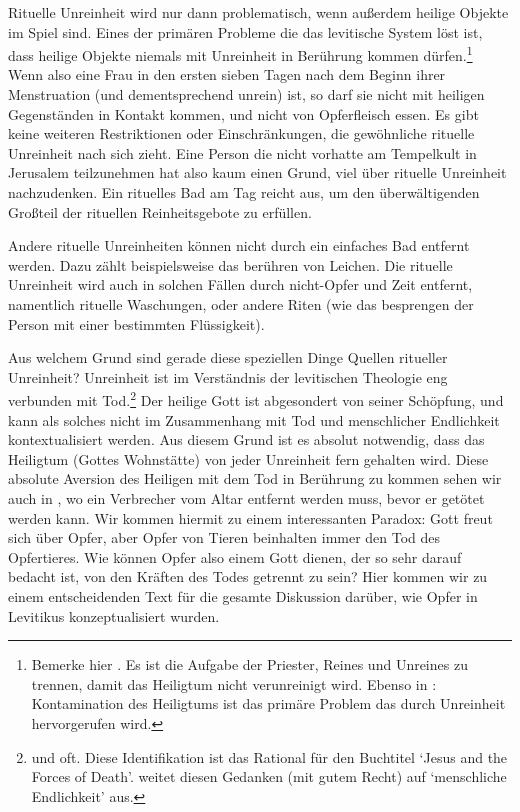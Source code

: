 Rituelle Unreinheit wird nur dann problematisch, wenn außerdem heilige Objekte im Spiel sind.
Eines der primären Probleme die das levitische System löst ist, dass heilige Objekte niemals mit Unreinheit in Berührung kommen dürfen.\footnote{
Bemerke hier .
Es ist die Aufgabe der Priester, Reines und Unreines zu trennen, damit das Heiligtum nicht verunreinigt wird.
Ebenso in : Kontamination des Heiligtums ist das primäre Problem das durch Unreinheit hervorgerufen wird.
}
Wenn also eine Frau in den ersten sieben Tagen nach dem Beginn ihrer Menstruation (und dementsprechend unrein) ist, so darf sie nicht mit heiligen Gegenständen in Kontakt kommen, und nicht von Opferfleisch essen.
Es gibt keine weiteren Restriktionen oder Einschränkungen, die gewöhnliche rituelle Unreinheit nach sich zieht.
Eine Person die nicht vorhatte am Tempelkult in Jerusalem teilzunehmen hat also kaum einen Grund, viel über rituelle Unreinheit nachzudenken.
Ein rituelles Bad am Tag reicht aus, um den überwältigenden Großteil der rituellen Reinheitsgebote zu erfüllen.

Andere rituelle Unreinheiten können nicht durch ein einfaches Bad entfernt werden. Dazu zählt beispielsweise das berühren von Leichen.
Die rituelle Unreinheit wird auch in solchen Fällen durch nicht-Opfer und Zeit entfernt, namentlich rituelle Waschungen, oder andere Riten (wie das besprengen der Person mit einer bestimmten Flüssigkeit).

Aus welchem Grund sind gerade diese speziellen Dinge Quellen ritueller Unreinheit?
Unreinheit ist im Verständnis der levitischen Theologie eng verbunden mit Tod.\footnote{
\Cite[46f]{milgrom-leviticus-1} und oft.
Diese Identifikation ist das Rational für den Buchtitel `Jesus and the Forces of Death'\Cite{jesus-and-the-forces-of-death}.
\Cite[75]{lamb-of-the-free} weitet diesen Gedanken (mit gutem Recht) auf `menschliche Endlichkeit' aus.
}
Der heilige Gott ist abgesondert von seiner Schöpfung, und kann als solches nicht im Zusammenhang mit Tod und menschlicher Endlichkeit kontextualisiert werden.
Aus diesem Grund ist es absolut notwendig, dass das Heiligtum (Gottes Wohnstätte) von jeder Unreinheit fern gehalten wird.
Diese absolute Aversion des Heiligen mit dem Tod in Berührung zu kommen sehen wir auch in , wo ein Verbrecher vom Altar entfernt werden muss, bevor er getötet werden kann.
Wir kommen hiermit zu einem interessanten Paradox: Gott freut sich über Opfer, aber Opfer von Tieren beinhalten immer den Tod des Opfertieres.
Wie können Opfer also einem Gott dienen, der so sehr darauf bedacht ist, von den Kräften des Todes getrennt zu sein?
Hier kommen wir zu einem entscheidenden Text für die gesamte Diskussion darüber, wie Opfer in Levitikus konzeptualisiert wurden.

